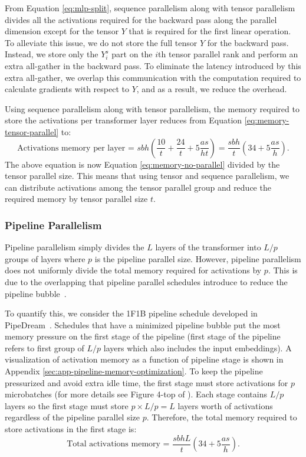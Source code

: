 \documentclass{article}
\begin{document}
From Equation \ref{eq:mlp-split}, sequence parallelism along with tensor parallelism divides all the activations required for the backward pass along the parallel dimension except for the tensor $Y$ that is required for the first linear operation. To alleviate this issue, we do not store the full tensor $Y$ for the backward pass. Instead, we store only the $Y_i^s$ part on the $i$th tensor parallel rank and perform an extra all-gather in the backward pass. To eliminate the latency introduced by this extra all-gather, we overlap this communication with the computation required to calculate gradients with respect to $Y$, and as a result, we reduce the overhead. 

Using sequence parallelism along with tensor parallelism, the memory required to store the activations per transformer layer reduces from Equation \ref{eq:memory-tensor-parallel} to:
\begin{equation}
     \text{Activations memory per layer = }  sbh \left(\frac{10}{t} +\frac{24}{t} + 5 \frac{as}{ht}\right) = \frac{sbh}{t} \left(34 + 5 \frac{as}{h}\right).
    \label{eq:memory-tensor-sequence-parallel}
\end{equation}
The above equation is now Equation \ref{eq:memory-no-parallel} divided by the tensor parallel size. This means that using tensor and sequence parallelism, we can distribute activations among the tensor parallel group and reduce the required memory by tensor parallel size $t$.


\subsubsection{Pipeline Parallelism}
\label{sec:pipeline-parallel}

Pipeline parallelism simply divides the $L$ layers of the transformer into $L/p$ groups of layers where $p$ is the pipeline parallel size. However, pipeline parallelism does not uniformly divide the total memory required for activations by $p$. This is due to the overlapping that pipeline parallel schedules introduce to reduce the pipeline bubble~\cite{megatron-pipeline}.

To quantify this, we consider the 1F1B pipeline schedule developed in PipeDream~\cite{1f1b-pipedream}. Schedules that have a minimized pipeline bubble put the most memory pressure on the first stage of the pipeline (first stage of the pipeline refers to first group of $L/p$ layers which also includes the input embeddings). A visualization of activation memory as a function of pipeline stage is shown in Appendix \ref{sec:app-pipeline-memory-optimization}. To keep the pipeline pressurized and avoid extra idle time, the first stage must store activations for $p$ microbatches (for more details see Figure 4-top of \cite{megatron-pipeline}). Each stage contains $L/p$ layers so the first stage must store $p \times L/p = L$ layers worth of activations regardless of the pipeline parallel size $p$. Therefore, the total memory required to store activations in the first stage is:
\begin{equation}
     \text{Total activations memory = } \frac{sbhL}{t} \left(34 + 5 \frac{as}{h}\right).
    \label{eq:memory-full-parallel}
\end{equation}
\end{document}
